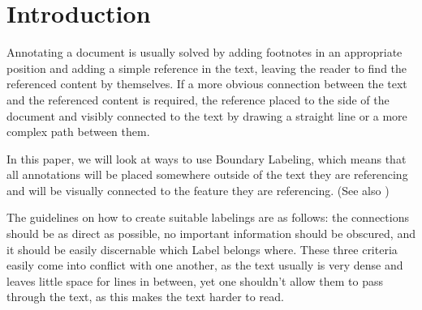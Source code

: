 \documentclass[11pt,a4paper]{vutinfth}
\begin{document}
\frontmatter
\addstatementpage






\tableofcontents

\mainmatter



\chapter{Introduction}%
Annotating a document is usually solved by adding footnotes in an appropriate position and adding a simple reference in the text, leaving the reader to find the referenced content by themselves. If a more obvious connection between the text and the referenced content is required, the reference placed to the side of the document and visibly connected to the text by drawing a straight line or a more complex path between them.

In this paper, we will look at ways to use Boundary Labeling, which means that all annotations will be placed somewhere outside of the text they are referencing and will be visually connected to the feature they are referencing. (See also \cite{Bekos2007}) 

The guidelines on how to create suitable labelings are as follows: the connections should be as direct as possible, no important information should be obscured, and it should be easily discernable which Label belongs where. These three criteria easily come into conflict with one another, as the text usually is very dense and leaves little space for lines in between, yet one shouldn't allow them to pass through the text, as this makes the text harder to read. 
\end{document}
